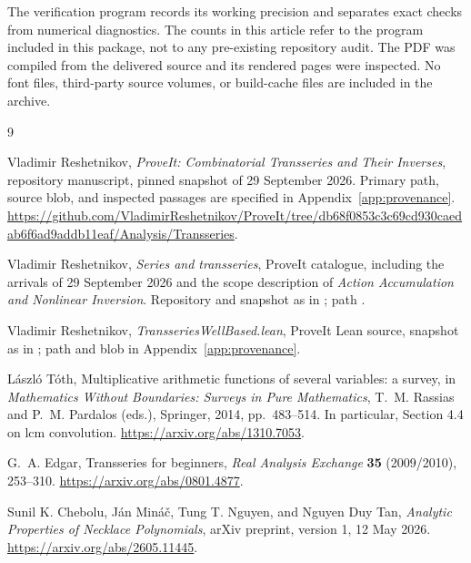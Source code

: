 \documentclass[11pt,a4paper]{article}
\numberwithin{equation}{section}
\theoremstyle{definition}
\theoremstyle{remark}
\begin{document}
The verification program records its working precision and separates
exact checks from numerical diagnostics. The counts in this article
refer to the program included in this package, not to any pre-existing
repository audit. The PDF was compiled from the delivered source and
its rendered pages were inspected. No font files, third-party source
volumes, or build-cache files are included in the archive.

\begin{thebibliography}{9}

Vladimir Reshetnikov, \emph{ProveIt: Combinatorial Transseries and Their
Inverses}, repository manuscript, pinned snapshot of 29 September 2026.
Primary path, source blob, and inspected passages are specified in
Appendix~\ref{app:provenance}.
\url{https://github.com/VladimirReshetnikov/ProveIt/tree/db68f0853c3c69cd930caedab6f6ad9addb11eaf/Analysis/Transseries}.

Vladimir Reshetnikov, \emph{Series and transseries}, ProveIt catalogue,
including the arrivals of 29 September 2026 and the scope description of
\emph{Action Accumulation and Nonlinear Inversion}. Repository and
snapshot as in \cite{repo}; path
.

Vladimir Reshetnikov, \emph{TransseriesWellBased.lean}, ProveIt Lean
source, snapshot as in \cite{repo}; path and blob in
Appendix~\ref{app:provenance}.

L\'aszl\'o T\'oth, Multiplicative arithmetic functions of several
variables: a survey, in \emph{Mathematics Without Boundaries: Surveys in
Pure Mathematics}, T.~M. Rassias and P.~M. Pardalos (eds.), Springer,
2014, pp.~483--514. In particular, Section 4.4 on lcm convolution.
\url{https://arxiv.org/abs/1310.7053}.

G.~A. Edgar, Transseries for beginners, \emph{Real Analysis Exchange}
\textbf{35} (2009/2010), 253--310.
\url{https://arxiv.org/abs/0801.4877}.

Sunil K. Chebolu, J\'an Min\'a\v{c}, Tung T. Nguyen, and Nguyen Duy Tan,
\emph{Analytic Properties of Necklace Polynomials}, arXiv preprint,
version 1, 12 May 2026.
\url{https://arxiv.org/abs/2605.11445}.

\end{thebibliography}
\end{document}
